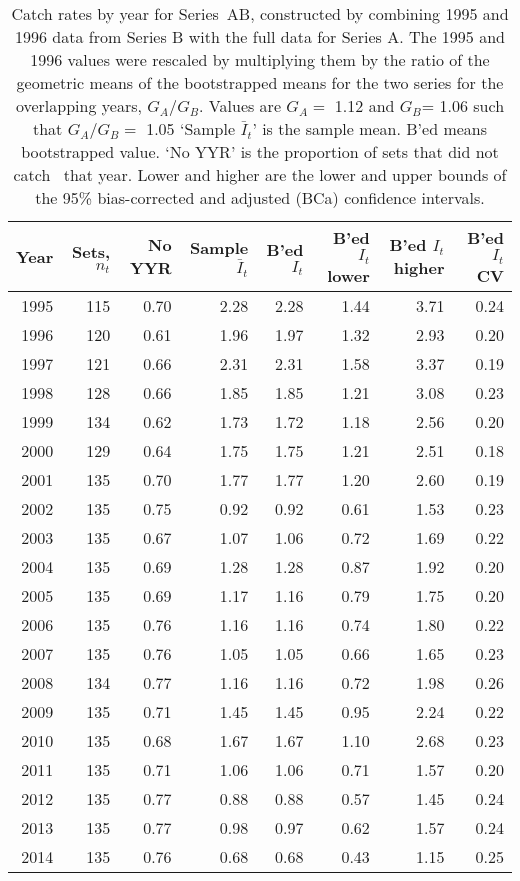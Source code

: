 \begin{table}[tp]
\centering
\caption{Catch rates by year for Series~AB, constructed by combining 
     1995 and 1996 data
     from Series B with the full data for Series A. The 1995 and 1996 values
     were rescaled by multiplying them by the ratio of the geometric means
     of the bootstrapped means for the two series for the overlapping 
     years, $G_A / G_B$. Values are
     $G_A=$ 1.12  and $G_B$= 1.06 such that $G_A / G_B=$ 1.05 `Sample $\bar{I}_t$' is the sample mean. B'ed means bootstrapped 
     value. `No YYR' is the proportion of sets that did not catch \spName
     ~that year. Lower and higher are the 
     lower and upper bounds of the 95\% bias-corrected and adjusted (BCa)
     confidence intervals.} 
\label{tab:serAB}
\begin{tabular}{rrrrrrrr}
  \hline
Year & Sets, $n_t$ & No YYR & Sample $\bar{I}_t$ & B'ed $I_t$ & B'ed $I_t$ lower & B'ed $I_t$ higher & B'ed $I_t$ CV \\ 
  \hline
1995 & 115 & 0.70 & 2.28 & 2.28 & 1.44 & 3.71 & 0.24 \\ 
  1996 & 120 & 0.61 & 1.96 & 1.97 & 1.32 & 2.93 & 0.20 \\ 
  1997 & 121 & 0.66 & 2.31 & 2.31 & 1.58 & 3.37 & 0.19 \\ 
  1998 & 128 & 0.66 & 1.85 & 1.85 & 1.21 & 3.08 & 0.23 \\ 
  1999 & 134 & 0.62 & 1.73 & 1.72 & 1.18 & 2.56 & 0.20 \\ 
  2000 & 129 & 0.64 & 1.75 & 1.75 & 1.21 & 2.51 & 0.18 \\ 
  2001 & 135 & 0.70 & 1.77 & 1.77 & 1.20 & 2.60 & 0.19 \\ 
  2002 & 135 & 0.75 & 0.92 & 0.92 & 0.61 & 1.53 & 0.23 \\ 
  2003 & 135 & 0.67 & 1.07 & 1.06 & 0.72 & 1.69 & 0.22 \\ 
  2004 & 135 & 0.69 & 1.28 & 1.28 & 0.87 & 1.92 & 0.20 \\ 
  2005 & 135 & 0.69 & 1.17 & 1.16 & 0.79 & 1.75 & 0.20 \\ 
  2006 & 135 & 0.76 & 1.16 & 1.16 & 0.74 & 1.80 & 0.22 \\ 
  2007 & 135 & 0.76 & 1.05 & 1.05 & 0.66 & 1.65 & 0.23 \\ 
  2008 & 134 & 0.77 & 1.16 & 1.16 & 0.72 & 1.98 & 0.26 \\ 
  2009 & 135 & 0.71 & 1.45 & 1.45 & 0.95 & 2.24 & 0.22 \\ 
  2010 & 135 & 0.68 & 1.67 & 1.67 & 1.10 & 2.68 & 0.23 \\ 
  2011 & 135 & 0.71 & 1.06 & 1.06 & 0.71 & 1.57 & 0.20 \\ 
  2012 & 135 & 0.77 & 0.88 & 0.88 & 0.57 & 1.45 & 0.24 \\ 
  2013 & 135 & 0.77 & 0.98 & 0.97 & 0.62 & 1.57 & 0.24 \\ 
  2014 & 135 & 0.76 & 0.68 & 0.68 & 0.43 & 1.15 & 0.25 \\ 
   \hline
\end{tabular}
\end{table}


